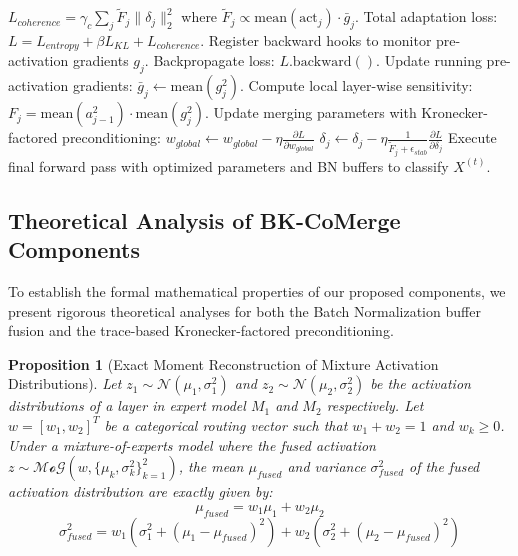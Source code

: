 \documentclass{article}
\theoremstyle{plain}
\newtheorem{proposition}[theorem]{Proposition}
\theoremstyle{definition}
\theoremstyle{remark}
\begin{document}
\begin{algorithm*}[t]
\begin{algorithmic}[1]
           \STATE \quad $L_{coherence} = \gamma_c \sum_{j} \tilde{F}_j \|\delta_j\|_2^2$ \quad where $\tilde{F}_j \propto \text{mean}(\text{act}_j) \cdot \bar{g}_j$.
           \STATE Total adaptation loss: $L = L_{entropy} + \beta L_{KL} + L_{coherence}$.
           \STATE Register backward hooks to monitor pre-activation gradients $g_j$.
           \STATE Backpropagate loss: $L.\text{backward}()$.
           \STATE Update running pre-activation gradients: $\bar{g}_j \leftarrow \text{mean}(g_j^2)$.
           \STATE Compute local layer-wise sensitivity: $F_j = \text{mean}(a_{j-1}^2) \cdot \text{mean}(g_j^2)$.
           \STATE Update merging parameters with Kronecker-factored preconditioning:
           \STATE \quad $w_{global} \leftarrow w_{global} - \eta \frac{\partial L}{\partial w_{global}}$
           \STATE \quad $\delta_j \leftarrow \delta_j - \eta \frac{1}{\tilde{F}_j + \epsilon_{stab}} \frac{\partial L}{\partial \delta_j}$
       \ENDFOR
       \STATE Execute final forward pass with optimized parameters and BN buffers to classify $X^{(t)}$.
   \ENDFOR
\end{algorithmic}
\end{algorithm*}

\subsection{Theoretical Analysis of BK-CoMerge Components}
To establish the formal mathematical properties of our proposed components, we present rigorous theoretical analyses for both the Batch Normalization buffer fusion and the trace-based Kronecker-factored preconditioning.

\begin{proposition}[Exact Moment Reconstruction of Mixture Activation Distributions]
\label{prop:bn_exact_moment}
Let $z_1 \sim \mathcal{N}(\mu_1, \sigma_1^2)$ and $z_2 \sim \mathcal{N}(\mu_2, \sigma_2^2)$ be the activation distributions of a layer in expert model $M_1$ and $M_2$ respectively. Let $w = [w_1, w_2]^T$ be a categorical routing vector such that $w_1 + w_2 = 1$ and $w_k \ge 0$. Under a mixture-of-experts model where the fused activation $z \sim \mathcal{MoG}(w, \{\mu_k, \sigma_k^2\}_{k=1}^2)$, the mean $\mu_{fused}$ and variance $\sigma_{fused}^2$ of the fused activation distribution are exactly given by:
\begin{equation}
    \mu_{fused} = w_1 \mu_1 + w_2 \mu_2
\end{equation}
\begin{equation}
    \sigma_{fused}^2 = w_1 \left(\sigma_1^2 + (\mu_1 - \mu_{fused})^2\right) + w_2 \left(\sigma_2^2 + (\mu_2 - \mu_{fused})^2\right)
\end{equation}
\end{proposition}
\end{document}
